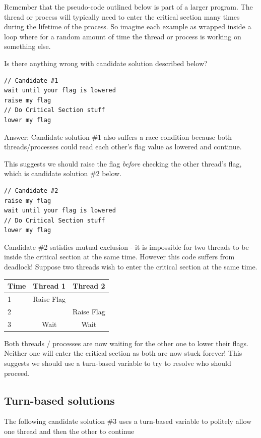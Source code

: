 Remember that the pseudo-code outlined below is part of a larger program.
The thread or process will typically need to enter the critical section many times during the lifetime of the process.
So imagine each example as wrapped inside a loop where for a random amount of time the thread or process is working on something else.

Is there anything wrong with candidate solution described below?

\begin{lstlisting}
// Candidate #1
wait until your flag is lowered
raise my flag
// Do Critical Section stuff
lower my flag
\end{lstlisting}

Answer: Candidate solution \#1 also suffers a race condition because both threads/processes could read each other's flag value as lowered and continue.

This suggests we should raise the flag \emph{before} checking the other thread's flag, which is candidate solution \#2 below.

\begin{lstlisting}
// Candidate #2
raise my flag
wait until your flag is lowered
// Do Critical Section stuff
lower my flag
\end{lstlisting}

Candidate \#2 satisfies mutual exclusion - it is impossible for two threads to be inside the critical section at the same time.
However this code suffers from deadlock!
Suppose two threads wish to enter the critical section at the same time.

\begin{tabular}{|l|c|c|}
Time & Thread 1 & Thread 2 \\ \hline
1 & Raise Flag & \\
2 & & Raise Flag \\
3 & Wait & Wait \\
\end{tabular}

Both threads / processes are now waiting for the other one to lower their flags.
Neither one will enter the critical section as both are now stuck forever!
This suggests we should use a turn-based variable to try to resolve who should proceed.

\subsection{Turn-based solutions}

The following candidate solution \#3 uses a turn-based variable to politely allow one thread and then the other to continue

